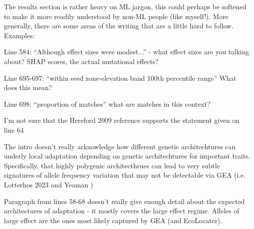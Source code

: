 
\begin{point}{} %
The results section is rather heavy on ML jargon, this could perhaps be softened to make it more readily understood by non-ML people (like myself!). More generally, there are some areas of the writing that are a little hard to follow. Examples:

Line 584: ``Although effect sizes were modest...'' - what effect sizes are you talking about? SHAP scores, the actual mutational effects?

Line 695-697: ``within seed zone-elevation band 100th percentile range'' What does this mean?

Line 698: ``proportion of matches'' what are matches in this context?
\end{point}


\begin{point}{} %
I'm not sure that the Hereford 2009 reference supports the statement given on line 64
\end{point}


\begin{point}{} %
The intro doesn't really acknowledge how different genetic architechtures can underly local adaptation depending on genetic architechtures for important traits. Specifically, that highly polygenic architecthrues can lead to very subtle signatures of allele frequency variation that may not be detectable via GEA (i.e. Lotterhos 2023 and Yeaman )
\end{point}


\begin{point}{} %
Paragraph from lines 58-68 doesn't really give enough detail about the expected architectures of adaptation - it mostly covers the large effect regime. Alleles of large effect are the ones most likely captured by GEA (and EcoLocater).
\end{point}

